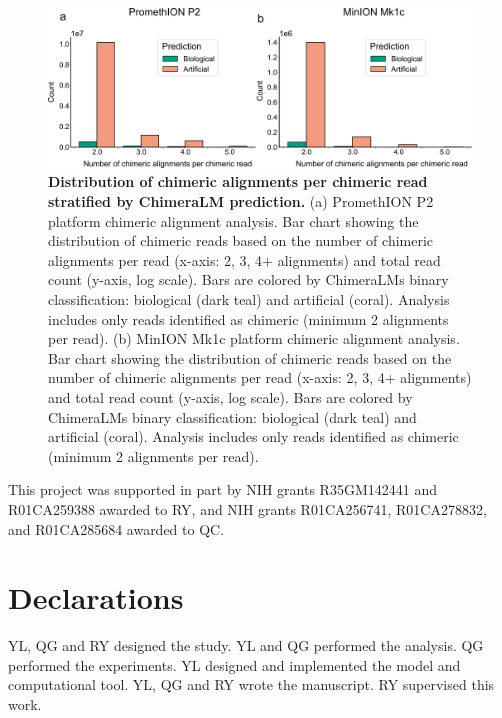 \documentclass[pdflatex,sn-nature]{sn-jnl}%
\theoremstyle{thmstyleone}%
\theoremstyle{thmstyletwo}%
\theoremstyle{thmstylethree}%
\begin{document}
\begin{figure}[!ht]
	\begin{center}
		\includegraphics[width=\textwidth]{final_figures/sf2}
	\end{center}
	\caption{{\bf Distribution of chimeric alignments per chimeric read stratified by ChimeraLM prediction.}
		(a) PromethION P2 platform chimeric alignment analysis. Bar chart showing the distribution of chimeric reads based on the number of chimeric alignments per read (x-axis: 2, 3, 4+ alignments) and total read count (y-axis, log scale). Bars are colored by ChimeraLM\textquotesingle s binary classification: biological (dark teal) and artificial (coral). Analysis includes only reads identified as chimeric (minimum 2 alignments per read).
		(b) MinION Mk1c platform chimeric alignment analysis. Bar chart showing the distribution of chimeric reads based on the number of chimeric alignments per read (x-axis: 2, 3, 4+ alignments) and total read count (y-axis, log scale). Bars are colored by ChimeraLM\textquotesingle s binary classification: biological (dark teal) and artificial (coral). Analysis includes only reads identified as chimeric (minimum 2 alignments per read). }\label{fig:sf2}
\end{figure}


This project was supported in part by NIH grants R35GM142441 and R01CA259388 awarded to RY, and NIH grants R01CA256741, R01CA278832, and R01CA285684 awarded to QC.

\section*{Declarations}


YL, QG and RY designed the study.
YL and QG performed the analysis.
QG performed the experiments.
YL designed and implemented the model and computational tool.
YL, QG and RY wrote the manuscript.
RY supervised this work.
\end{document}
